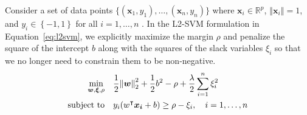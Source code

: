 \documentclass{article}
\def\R{\mathbb{R}}
\def\T{^\intercal}
\newcommand{\st}{\mathop{\mathrm{subject\,\,to}}}
\begin{document}
Consider a set of data points $\{\left(\boldsymbol{x}_1,y_1\right),\dotsc,\left(\boldsymbol{x}_n,y_n\right)\}$ where $\boldsymbol{x}_i \in \R^p$, $\left\Vert \boldsymbol{x}_{i}\right\Vert=1$, and $y_i \in \left\{-1,1\right\}$ for all $i=1,\dotsc,n$ . In the L2-SVM formulation in Equation~\ref{eq:l2svm}, we explicitly maximize the margin $\rho$ and penalize the square of the intercept $b$ along with the squares of the slack variables $\xi_i$ so that we no longer need to constrain them to be non-negative. 
\begin{align}
    \min_{\boldsymbol{w}, \boldsymbol{\xi}, \rho}&\quad \frac{1}{2} \norm{\boldsymbol{w}}_2^2 + \frac{1}{2}b^2- \rho + \frac{\lambda}{2} \sum_{i=1}^n \xi_i^2 \nonumber\\
    \st&\quad y_i(w\T \boldsymbol{x_i} + b) \ge \rho - \xi_i,\quad i = 1,\dotsc,n \label{eq:l2svm}		
\end{align}
\end{document}
